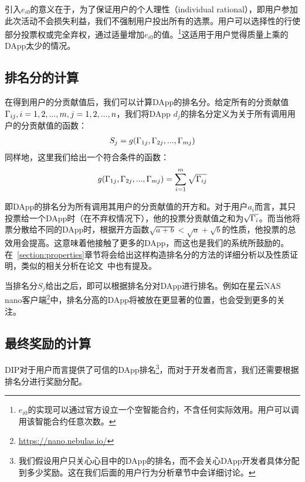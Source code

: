 引入$e_{i0}$的意义在于，为了保证用户的个人理性（individual rational），即用户参加此次活动不会损失利益，我们不强制用户投出所有的选票。用户可以选择性的行使部分投票权或完全弃权，通过适量增加$e_{i0}$的值。\footnote{$e_{i0}$的实现可以通过官方设立一个空智能合约，不含任何实际效用。用户可以调用该智能合约任意次数。}这适用于用户觉得质量上乘的DApp太少的情况。


\subsection{排名分的计算}
在得到用户的分贡献值后，我们可以计算DApp的排名分。给定所有的分贡献值$\Gamma_{ij}, i=1,2,...,m,j=1,2,...,n$，我们将DApp $d_j$的排名分定义为关于所有调用用户的分贡献值的函数：
\begin{align}
S_j = g(\Gamma_{1j},\Gamma_{2j},...,\Gamma_{mj})
\end{align}
同样地，这里我们给出一个符合条件的函数：
\begin{align}
\label{eq:sqrt}
g(\Gamma_{1j},\Gamma_{2j},...,\Gamma_{mj}) = \sum_{i=1}^m \sqrt{\Gamma_{ij}}
\end{align}

即DApp的排名分为所有调用其用户的分贡献值的开方和。对于用户$a_i$而言，其只投票给一个DApp时（在不弃权情况下），他的投票分贡献值之和为$\sqrt{\Gamma_i}$。而当他将票分散给不同的DApp时，根据开方函数$\sqrt{a+b}<\sqrt{a}+\sqrt{b}$的性质，他投票的总效用会提高。这意味着他接触了更多的DApp，而这也是我们的系统所鼓励的。在~\ref{section:properties}章节将会给出这样构造排名分的方法的详细分析以及性质证明，类似的相关分析在论文~\cite{buterin2018liberal}中也有提及。


当排名分$S_j$给出之后，即可以根据排名分对DApp进行排名。例如在星云NAS nano客户端\footnote{\url{https://nano.nebulas.io/}}中，排名分高的DApp将被放在更显著的位置，也会受到更多的关注。


\subsection{最终奖励的计算}
DIP对于用户而言提供了可信的DApp排名\footnote{我们假设用户只关心心目中的DApp的排名，而不会关心DApp开发者具体分配到多少奖励。这在我们后面的用户行为分析章节中会详细讨论。}，而对于开发者而言，我们还需要根据排名分进行奖励分配。

